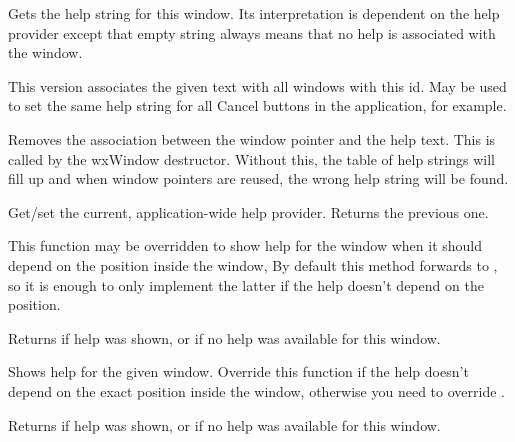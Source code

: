 
Gets the help string for this window. Its interpretation is dependent on the help provider
except that empty string always means that no help is associated with
the window.


This version associates the given text with all windows with this id.
May be used to set the same help string for all Cancel buttons in
the application, for example.


\label{wxhelpproviderremovehelp}


Removes the association between the window pointer and the help text. This is
called by the wxWindow destructor. Without this, the table of help strings will fill up
and when window pointers are reused, the wrong help string will be found.


\label{wxhelpproviderset}


Get/set the current, application-wide help provider. Returns
the previous one.


\label{wxhelpprovidershowhelpatpoint}


This function may be overridden to show help for the window when it should
depend on the position inside the window, By default this method forwards to 
, so it is enough to only implement
the latter if the help doesn't depend on the position.

Returns \true if help was shown, or \false if no help was available for this
window.







\label{wxhelpprovidershowhelp}


Shows help for the given window. Override this function if the help doesn't
depend on the exact position inside the window, otherwise you need to override 
.

Returns \true if help was shown, or \false if no help was available for this
window.

